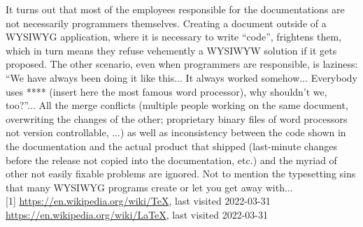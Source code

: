 	\newline It turns out that most of the employees responsible for the documentations are not necessarily programmers themselves. Creating a document outside of a WYSIWYG application, where it is necessary to write \enquote{code}, frightens them, which in turn means they refuse vehemently a WYSIWYW solution if it gets proposed. The other scenario, even when programmers are responsible, is laziness: \enquote{We have always been doing it like this... It always worked somehow... Everybody uses **** (insert here the most famous word processor), why shouldn't we, too?}... All the merge conflicts (multiple people  working on the same document, overwriting the changes of the other; proprietary binary files of word processors not version controllable, ...) as well as inconsistency between the code shown in the documentation and the actual product that shipped (last-minute changes before the release not copied into the documentation, etc.) and the myriad of other not easily fixable problems are ignored. Not to mention the typesetting sins that many WYSIWYG programs create or let you get away with...\\[0.5cm]
	\footnotesize
	\label{preface:references}
	[1] \href{https://en.wikipedia.org/wiki/TeX}{https://en.wikipedia.org/wiki/TeX}, last visited 2022-03-31
	\newline [2] \href{https://en.wikipedia.org/wiki/LaTeX}{https://en.wikipedia.org/wiki/LaTeX}, last visited 2022-03-31
	\normalsize
